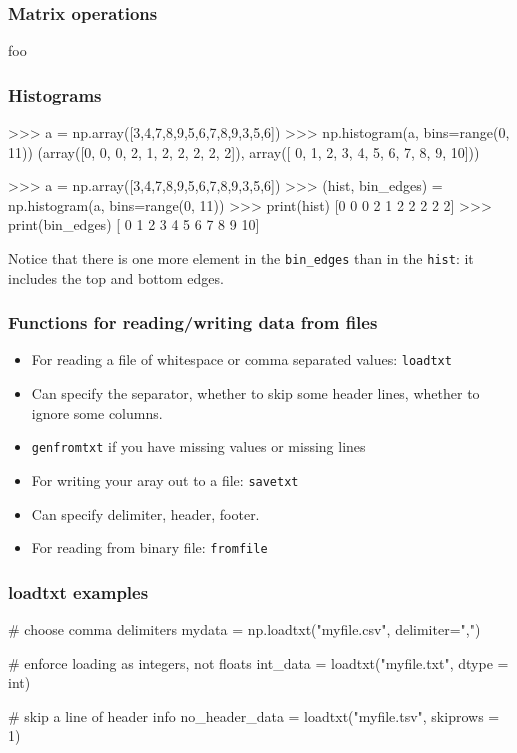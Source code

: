\documentclass{beamer}
\begin{document}
\begin{frame}[fragile]
\frametitle{Matrix operations}

foo
\end{frame}





\begin{frame}[fragile]
\frametitle{Histograms}
\begin{code}
>>> a = np.array([3,4,7,8,9,5,6,7,8,9,3,5,6])
>>> np.histogram(a, bins=range(0, 11))
(array([0, 0, 0, 2, 1, 2, 2, 2, 2, 2]), array([ 0,  1,  2,  3,  4,  5,  6,  7,  8,  9, 10]))

>>> a = np.array([3,4,7,8,9,5,6,7,8,9,3,5,6])
>>> (hist, bin_edges) = np.histogram(a, bins=range(0, 11))
>>> print(hist)
[0 0 0 2 1 2 2 2 2 2]
>>> print(bin_edges)
[ 0  1  2  3  4  5  6  7  8  9 10]
\end{code}

Notice that there is one more element in the \texttt{bin\_edges} than in the \texttt{hist}: it includes the top and bottom edges.
\end{frame}




\begin{frame}[fragile]
\frametitle{Functions for reading/writing data from files}
\begin{itemize}
\item For reading a file of whitespace or comma separated values: \texttt{loadtxt}
\item Can specify the separator, whether to skip some header lines,
  whether to ignore some columns.
\item \texttt{genfromtxt} if you have missing values or missing lines
\item For writing your aray out to a file: \texttt{savetxt}
\item Can specify delimiter, header, footer.
\item For reading from binary file: \texttt{fromfile}
\end{itemize}
\end{frame}

\begin{frame}[fragile]
\frametitle{loadtxt examples}
\begin{code}
# choose comma delimiters
mydata = np.loadtxt("myfile.csv", delimiter=",")

# enforce loading as integers, not floats
int_data = loadtxt("myfile.txt", dtype = int)

# skip a line of header info
no_header_data = loadtxt("myfile.tsv", skiprows = 1)
\end{code}
\end{frame}
\end{document}
